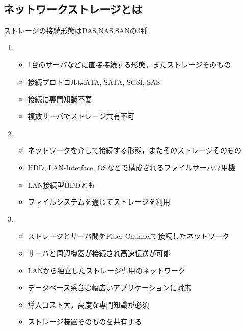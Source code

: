 \subsection{ネットワークストレージとは}
ストレージの接続形態はDAS,NAS,SANの3種
\begin{enumerate}
    \item {}
    \begin{itemize}
        \item 1台のサーバなどに直接接続する形態，またストレージそのもの
        \item 接続プロトコルはATA, SATA, SCSI, SAS
        \item 接続に専門知識不要
        \item 複数サーバでストレージ共有不可
    \end{itemize}
    \item {}
    \begin{itemize}
        \item ネットワークを介して接続する形態，またそのストレージそのもの
        \item HDD, LAN-Interface, OSなどで構成されるファイルサーバ専用機
        \item LAN接続型HDDとも
        \item ファイルシステムを通じてストレージを利用
    \end{itemize}
    \item {}
    \begin{itemize}
        \item ストレージとサーバ間をFiber Channelで接続したネットワーク
        \item サーバと周辺機器が接続され高速伝送が可能
        \item LANから独立したストレージ専用のネットワーク
        \item データベース系含む幅広いアプリケーションに対応
        \item 導入コスト大，高度な専門知識が必須
        \item ストレージ装置そのものを共有する
    \end{itemize}
\end{enumerate}

